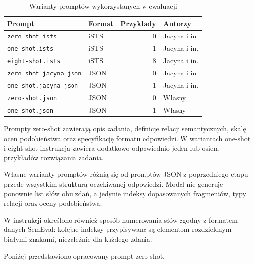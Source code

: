 \documentclass[a4paper,10pt]{article}
\begin{document}
\begin{table}[htbp]
    \centering
    \caption{Warianty promptów wykorzystanych w ewaluacji}
    \label{tab:evaluation_prompts}
    \begin{tabular}{llrl}
        \toprule
        Prompt & Format & Przykłady & Autorzy \\
        \midrule
        \texttt{zero-shot.ists}
            & iSTS & 0 & Jacyna i in. \\
        \texttt{one-shot.ists}
            & iSTS & 1 & Jacyna i in. \\
        \texttt{eight-shot.ists}
            & iSTS & 8 & Jacyna i in. \\
        \texttt{zero-shot.jacyna-json}
            & JSON & 0 & Jacyna i in. \\
        \texttt{one-shot.jacyna-json}
            & JSON & 1 & Jacyna i in. \\
        \texttt{zero-shot.json}
            & JSON & 0 & Własny \\
        \texttt{one-shot.json}
            & JSON & 1 & Własny \\
        \bottomrule
    \end{tabular}
\end{table}

Prompty zero-shot zawierają opis zadania, definicje
relacji semantycznych, skalę ocen podobieństwa oraz
specyfikację formatu odpowiedzi. W wariantach one-shot
i eight-shot instrukcja zawiera dodatkowo odpowiednio
jeden lub osiem przykładów rozwiązania zadania.

Własne warianty promptów różnią się od promptów JSON
z poprzedniego etapu przede wszystkim strukturą
oczekiwanej odpowiedzi. Model nie generuje ponownie
list słów obu zdań, a jedynie indeksy dopasowanych
fragmentów, typy relacji oraz oceny podobieństwa.

W instrukcji określono również sposób numerowania
słów zgodny z formatem danych SemEval: kolejne indeksy
przypisywane są elementom rozdzielonym białymi znakami,
niezależnie dla każdego zdania.

Poniżej przedstawiono opracowany prompt zero-shot.
\end{document}

